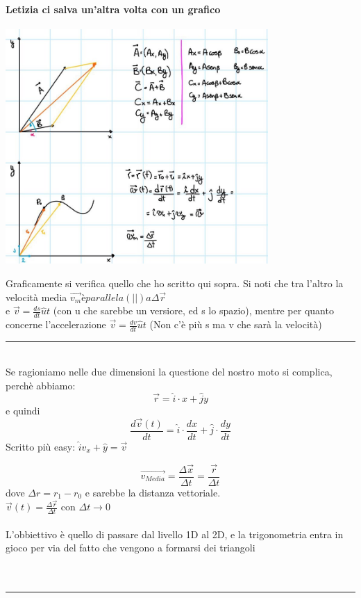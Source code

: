 \documentclass[12pt, a4paper, openany, oneside]{book}
\begin{document}
\paragraph{Letizia ci salva un'altra volta con un grafico}
\begin{center}
\includegraphics[width=0.75\textwidth]{sommaVettoriale}
\end{center}
Graficamente si verifica quello che ho scritto qui sopra. Si noti che tra l'altro
la velocità media
$\overrightarrow{v_{m}} è parallela (||) a \Delta \overrightarrow{r}$\\
e $\overrightarrow{v}=\frac{ds}{dt} \widehat{u}t $ (con u che sarebbe un 
versiore, ed s lo spazio), mentre per quanto concerne l'accelerazione 
$\overrightarrow{v}=\frac{dv}{dt} \widehat{u}t $ (Non c'è più s ma v che sarà
la velocità)
{\color{black} \rule{\linewidth}{0.3mm} }
\\
Se ragioniamo nelle due dimensioni la questione del nostro moto si complica, 
perchè abbiamo:
\[\overrightarrow{r} = \widehat{i}\cdot x + \widehat{j} y\] e quindi
\[\frac{d \overrightarrow{v} (t)}{dt} = \widehat{i} \cdot \frac{dx}{dt}+ 
\widehat{j} \cdot \frac{dy}{dt}\]
Scritto più easy: $\widehat{i} v_{x} + \widehat{y} = \overrightarrow{v}$

\[\overrightarrow{v_{Media}}= \frac{\Delta \overrightarrow{x}}{\Delta t} = 
\frac{\overrightarrow{r}}{\Delta t} \] dove $\Delta r = r_{1} - r_{0}$ e sarebbe
la distanza vettoriale.  \\ 
$\overrightarrow{v}(t) = \frac{\Delta \overrightarrow{r}}{\Delta t}$ con 
$\Delta t \to 0$
\\ \\ 
L'obbiettivo è quello di passare dal livello 1D al 2D, e la trigonometria entra
in gioco per via del fatto che vengono a formarsi dei triangoli
\\ \\
\\
{\color{black} \rule{\linewidth}{0.3mm} }
\end{document}
